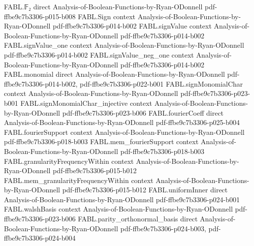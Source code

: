 \begin{theorem}
\label{FABL.IsPCPP.exists_close_of_acceptanceProbability_ge}
\leanok
{}
\proofstep
  {FABL.𝔽₂}
  {direct}
  {Analysis-of-Boolean-Functions-by-Ryan-ODonnell}
  {pdf-ffbe9c7b3306-p015-b008}
\proofstep
  {FABL.Sign}
  {context}
  {Analysis-of-Boolean-Functions-by-Ryan-ODonnell}
  {pdf-ffbe9c7b3306-p014-b002}
\proofstep
  {FABL.signValue}
  {context}
  {Analysis-of-Boolean-Functions-by-Ryan-ODonnell}
  {pdf-ffbe9c7b3306-p014-b002}
\proofstep
  {FABL.signValue_one}
  {context}
  {Analysis-of-Boolean-Functions-by-Ryan-ODonnell}
  {pdf-ffbe9c7b3306-p014-b002}
\proofstep
  {FABL.signValue_neg_one}
  {context}
  {Analysis-of-Boolean-Functions-by-Ryan-ODonnell}
  {pdf-ffbe9c7b3306-p014-b002}
\proofstep
  {FABL.monomial}
  {direct}
  {Analysis-of-Boolean-Functions-by-Ryan-ODonnell}
  {pdf-ffbe9c7b3306-p014-b002,
    pdf-ffbe9c7b3306-p022-b001}
\proofstep
  {FABL.signMonomialChar}
  {context}
  {Analysis-of-Boolean-Functions-by-Ryan-ODonnell}
  {pdf-ffbe9c7b3306-p023-b001}
\proofstep
  {FABL.signMonomialChar_injective}
  {context}
  {Analysis-of-Boolean-Functions-by-Ryan-ODonnell}
  {pdf-ffbe9c7b3306-p023-b006}
\proofstep
  {FABL.fourierCoeff}
  {direct}
  {Analysis-of-Boolean-Functions-by-Ryan-ODonnell}
  {pdf-ffbe9c7b3306-p025-b004}
\proofstep
  {FABL.fourierSupport}
  {context}
  {Analysis-of-Boolean-Functions-by-Ryan-ODonnell}
  {pdf-ffbe9c7b3306-p018-b003}
\proofstep
  {FABL.mem_fourierSupport}
  {context}
  {Analysis-of-Boolean-Functions-by-Ryan-ODonnell}
  {pdf-ffbe9c7b3306-p018-b003}
\proofstep
  {FABL.granularityFrequencyWithin}
  {context}
  {Analysis-of-Boolean-Functions-by-Ryan-ODonnell}
  {pdf-ffbe9c7b3306-p015-b012}
\proofstep
  {FABL.mem_granularityFrequencyWithin}
  {context}
  {Analysis-of-Boolean-Functions-by-Ryan-ODonnell}
  {pdf-ffbe9c7b3306-p015-b012}
\proofstep
  {FABL.uniformInner}
  {direct}
  {Analysis-of-Boolean-Functions-by-Ryan-ODonnell}
  {pdf-ffbe9c7b3306-p024-b001}
\proofstep
  {FABL.walshBasis}
  {context}
  {Analysis-of-Boolean-Functions-by-Ryan-ODonnell}
  {pdf-ffbe9c7b3306-p023-b006}
\proofstep
  {FABL.parity_orthonormal_basis}
  {direct}
  {Analysis-of-Boolean-Functions-by-Ryan-ODonnell}
  {pdf-ffbe9c7b3306-p024-b003,
    pdf-ffbe9c7b3306-p024-b004}

\end{theorem}
